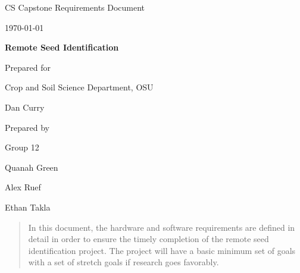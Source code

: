 \documentclass[onecolumn, draftclsnofoot,10pt, compsoc]{IEEEtran}
\def \CapstoneTeamName{		The Cleverly Named Team}
\def \CapstoneTeamNumber{		12}
\def \GroupMemberOne{			Quanah Green}
\def \GroupMemberTwo{			Alex Ruef}
\def \GroupMemberThree{			Ethan Takla}
\def \CapstoneProjectName{		Remote Seed Identification}
\def \CapstoneSponsorCompany{	Crop and Soil Science Department, OSU}
\def \CapstoneSponsorPerson{		Dan Curry}
\def \DocType{		%
				Requirements Document
				}
\newcommand{\NameSigPair}[1]{\par
\makebox[2.75in][r]{#1} \hfil 	\makebox[3.25in]{\makebox[2.25in]{\hrulefill} \hfill		\makebox[.75in]{\hrulefill}}
\par\vspace{-12pt} \textit{\tiny\noindent
\makebox[2.75in]{} \hfil		\makebox[3.25in]{\makebox[2.25in][r]{Signature} \hfill	\makebox[.75in][r]{Date}}}}
\renewcommand{\NameSigPair}[1]{#1}
\begin{document}
\begin{titlepage}
    \begin{singlespace}
        \hfill 
        \par\vspace{.2in}
        \centering
        \scshape{
            \huge CS Capstone \DocType \par
            {\large\today}\par
            \vspace{.5in}
            \textbf{\Huge\CapstoneProjectName}\par
            \vfill
            {\large Prepared for}\par
            \Huge \CapstoneSponsorCompany\par
            \vspace{5pt}
            {\Large\NameSigPair{\CapstoneSponsorPerson}\par}
            {\large Prepared by }\par
            Group\CapstoneTeamNumber\par
            \vspace{5pt}
            {\Large
                \NameSigPair{\GroupMemberOne}\par
                \NameSigPair{\GroupMemberTwo}\par
                \NameSigPair{\GroupMemberThree}\par
            }
            \vspace{20pt}
        }
        \begin{abstract}
		In this document, the hardware and software requirements are defined in detail in order to ensure the timely completion of the remote seed identification project. The project will have a basic minimum set of goals with a set of stretch goals if research goes favorably. 

        \end{abstract}     
    \end{singlespace}
\end{titlepage}
\newpage
{}
\tableofcontents
\clearpage
\end{document}
